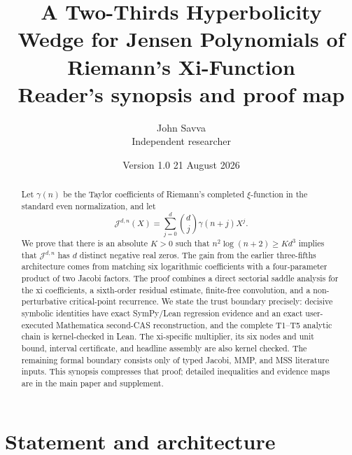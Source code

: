 \documentclass[11pt]{article}
\title{A Two-Thirds Hyperbolicity Wedge for Jensen Polynomials of
Riemann's Xi-Function\\\large Reader's synopsis and proof map}
\author{John Savva\\{\small Independent researcher}}
\date{Version 1.0 \textemdash{} 21 August 2026}
\theoremstyle{definition}
\theoremstyle{remark}
\newcommand{\J}{\mathcal J}
\begin{document}
\maketitle

\begin{center}
\end{center}

\begin{abstract}
Let $\gamma(n)$ be the Taylor coefficients of Riemann's completed
$\xi$-function in the standard even normalization, and let
\[
  \J^{d,n}(X)=\sum_{j=0}^d \binom{d}{j}\gamma(n+j)X^j.
\]
We prove that there is an absolute $K>0$ such that
$n^2\log(n+2)\ge Kd^3$ implies that $\J^{d,n}$ has $d$ distinct negative
real zeros.  The gain from the earlier three-fifths architecture comes from
matching six logarithmic coefficients with a four-parameter product of two
Jacobi factors.  The proof combines a direct sectorial saddle analysis for
the xi coefficients, a sixth-order residual estimate, finite-free
convolution, and a non-perturbative critical-point recurrence.  We state the
trust boundary precisely: decisive symbolic identities have exact
SymPy/Lean regression evidence and an exact user-executed Mathematica
second-CAS reconstruction, and the complete T1--T5 analytic chain is
kernel-checked in Lean.  The xi-specific multiplier, its six nodes and unit
bound, interval certificate, and headline assembly are also kernel checked.
The remaining formal boundary consists only of typed Jacobi, MMP, and MSS
literature inputs.
This synopsis compresses that proof; detailed inequalities and evidence maps
are in the main paper and supplement.
\end{abstract}

\section{Statement and architecture}
\end{document}
